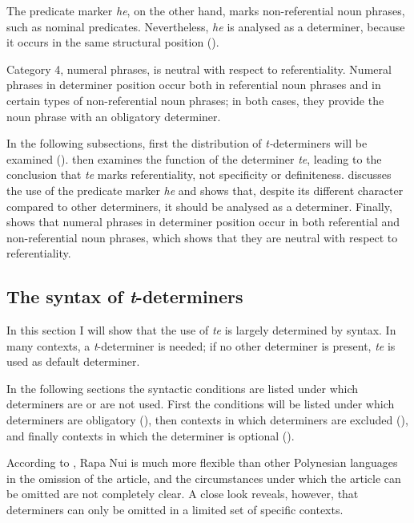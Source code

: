 The predicate marker \textit{he}, on the other hand, marks non-referential noun phrases, such as nominal predicates. Nevertheless, \textit{he} is analysed as a determiner, because it occurs in the same structural position (). 

Category 4, numeral phrases, is neutral with respect to referentiality. Numeral phrases in determiner position occur both in referential noun phrases and in certain types of non-referential noun phrases; in both cases, they provide the noun phrase with an obligatory determiner.

In the following subsections, first the distribution of \textit{t-}determiners will be examined ().  then examines the function of the determiner \textit{te}, leading to the conclusion that \textit{te} marks referentiality, not specificity or definiteness.  discusses the use of the predicate marker \textit{he} and shows that, despite its different character compared to other determiners, it should be analysed as a determiner. Finally,  shows that numeral phrases in determiner position occur in both referential and non-referential noun phrases, which shows that they are neutral with respect to referentiality.

\subsection{The syntax of \textit{t}{}-determiners}\label{sec:5.3.2}

In this section I will show that the use of \textit{te} is largely determined by syntax. In many contexts, a \textit{t}{}-determiner is needed; if no other determiner is present, \textit{te} is used as default determiner. 

In the following sections the syntactic conditions are listed under which determiners are or are not used. First the conditions will be listed under which determiners are obligatory (), then contexts in which determiners are excluded (), and finally contexts in which the determiner is optional (). 

According to \citet{Chapin1974}, Rapa Nui is much more flexible than other Polynesian languages in the omission of the article, and the circumstances under which the article can be omitted are not completely clear. A close look reveals, however, that determiners can only be omitted in a limited set of specific contexts.

